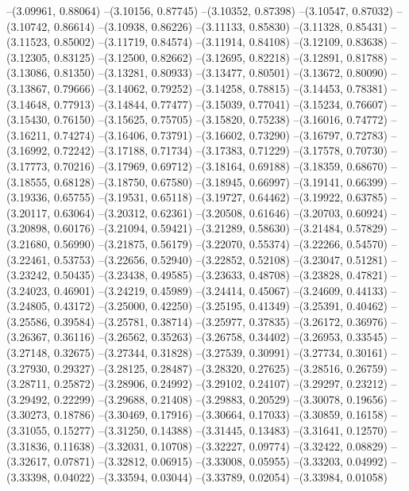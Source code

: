 --(3.09961, 0.88064)
--(3.10156, 0.87745)
--(3.10352, 0.87398)
--(3.10547, 0.87032)
--(3.10742, 0.86614)
--(3.10938, 0.86226)
--(3.11133, 0.85830)
--(3.11328, 0.85431)
--(3.11523, 0.85002)
--(3.11719, 0.84574)
--(3.11914, 0.84108)
--(3.12109, 0.83638)
--(3.12305, 0.83125)
--(3.12500, 0.82662)
--(3.12695, 0.82218)
--(3.12891, 0.81788)
--(3.13086, 0.81350)
--(3.13281, 0.80933)
--(3.13477, 0.80501)
--(3.13672, 0.80090)
--(3.13867, 0.79666)
--(3.14062, 0.79252)
--(3.14258, 0.78815)
--(3.14453, 0.78381)
--(3.14648, 0.77913)
--(3.14844, 0.77477)
--(3.15039, 0.77041)
--(3.15234, 0.76607)
--(3.15430, 0.76150)
--(3.15625, 0.75705)
--(3.15820, 0.75238)
--(3.16016, 0.74772)
--(3.16211, 0.74274)
--(3.16406, 0.73791)
--(3.16602, 0.73290)
--(3.16797, 0.72783)
--(3.16992, 0.72242)
--(3.17188, 0.71734)
--(3.17383, 0.71229)
--(3.17578, 0.70730)
--(3.17773, 0.70216)
--(3.17969, 0.69712)
--(3.18164, 0.69188)
--(3.18359, 0.68670)
--(3.18555, 0.68128)
--(3.18750, 0.67580)
--(3.18945, 0.66997)
--(3.19141, 0.66399)
--(3.19336, 0.65755)
--(3.19531, 0.65118)
--(3.19727, 0.64462)
--(3.19922, 0.63785)
--(3.20117, 0.63064)
--(3.20312, 0.62361)
--(3.20508, 0.61646)
--(3.20703, 0.60924)
--(3.20898, 0.60176)
--(3.21094, 0.59421)
--(3.21289, 0.58630)
--(3.21484, 0.57829)
--(3.21680, 0.56990)
--(3.21875, 0.56179)
--(3.22070, 0.55374)
--(3.22266, 0.54570)
--(3.22461, 0.53753)
--(3.22656, 0.52940)
--(3.22852, 0.52108)
--(3.23047, 0.51281)
--(3.23242, 0.50435)
--(3.23438, 0.49585)
--(3.23633, 0.48708)
--(3.23828, 0.47821)
--(3.24023, 0.46901)
--(3.24219, 0.45989)
--(3.24414, 0.45067)
--(3.24609, 0.44133)
--(3.24805, 0.43172)
--(3.25000, 0.42250)
--(3.25195, 0.41349)
--(3.25391, 0.40462)
--(3.25586, 0.39584)
--(3.25781, 0.38714)
--(3.25977, 0.37835)
--(3.26172, 0.36976)
--(3.26367, 0.36116)
--(3.26562, 0.35263)
--(3.26758, 0.34402)
--(3.26953, 0.33545)
--(3.27148, 0.32675)
--(3.27344, 0.31828)
--(3.27539, 0.30991)
--(3.27734, 0.30161)
--(3.27930, 0.29327)
--(3.28125, 0.28487)
--(3.28320, 0.27625)
--(3.28516, 0.26759)
--(3.28711, 0.25872)
--(3.28906, 0.24992)
--(3.29102, 0.24107)
--(3.29297, 0.23212)
--(3.29492, 0.22299)
--(3.29688, 0.21408)
--(3.29883, 0.20529)
--(3.30078, 0.19656)
--(3.30273, 0.18786)
--(3.30469, 0.17916)
--(3.30664, 0.17033)
--(3.30859, 0.16158)
--(3.31055, 0.15277)
--(3.31250, 0.14388)
--(3.31445, 0.13483)
--(3.31641, 0.12570)
--(3.31836, 0.11638)
--(3.32031, 0.10708)
--(3.32227, 0.09774)
--(3.32422, 0.08829)
--(3.32617, 0.07871)
--(3.32812, 0.06915)
--(3.33008, 0.05955)
--(3.33203, 0.04992)
--(3.33398, 0.04022)
--(3.33594, 0.03044)
--(3.33789, 0.02054)
--(3.33984, 0.01058)
